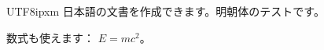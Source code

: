 \documentclass[12pt]{article}
\begin{document}
\begin{CJK*}{UTF8}{ipxm}
日本語の文書を作成できます。明朝体のテストです。


数式も使えます： $E = mc^2$。
\end{CJK*}
\end{document}
